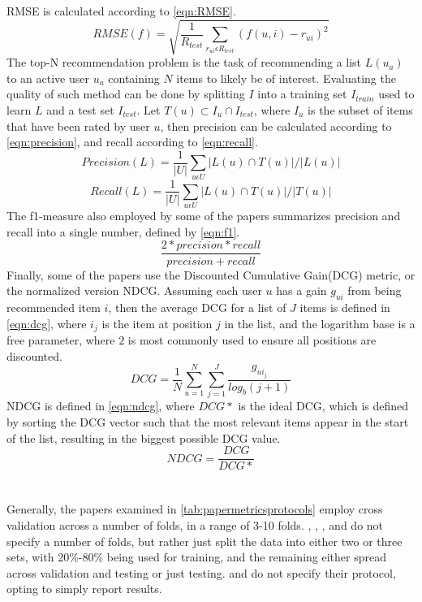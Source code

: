 RMSE is calculated according to \autoref{eqn:RMSE}.
\begin{equation}
    \label{eqn:RMSE}
    RMSE(f) = \sqrt{\frac{1}{R_{test}} \sum\limits_{r_{ui} \epsilon R_{test}} (f(u, i) - r_{ui})^2}
\end{equation}
The top-N recommendation problem is the task of recommending a list $L(u_a)$ to an active user $u_a$ containing $N$ items to likely be of interest.
Evaluating the quality of such method can be done by splitting $I$ into a training set $I_{train}$ used to learn $L$ and a test set $I_{test}$.
Let $T(u) \subset I_u \cap I_{test}$, where $I_u$ is the subset of items that have been rated by user $u$, then precision can be calculated according to \autoref{eqn:precision}, and recall according to \autoref{eqn:recall}.
\begin{equation}
    \label{eqn:precision}
    Precision(L) = \frac{1}{|U|} \sum\limits_{u \epsilon U} |L(u) \cap T(u)| / |L(u)|
\end{equation}
\begin{equation}
    \label{eqn:recall}
    Recall(L) = \frac{1}{|U|} \sum\limits_{u \epsilon U} |L(u) \cap T(u)| / |T(u)|
\end{equation}
The f1-measure also employed by some of the papers summarizes precision and recall into a single number, defined by \autoref{eqn:f1}.
\begin{equation}
    \label{eqn:f1}
    \frac{2*precision*recall}{precision+recall}
\end{equation}
Finally, some of the papers use the Discounted Cumulative Gain(DCG) metric, or the normalized version NDCG.
Assuming each user $u$ has a gain $g_{ui}$ from being recommended item $i$, then the average DCG for a list of $J$ items is defined in \autoref{eqn:dcg}, where $i_j$ is the item at position $j$ in the list, and the logarithm base is a free parameter, where $2$ is most commonly used to ensure all positions are discounted.
\begin{equation}
    \label{eqn:dcg}
    DCG = \frac{1}{N} \sum\limits_{u=1}^N \sum\limits_{j = 1}^J \frac{g_{ui_j}}{log_b (j+1)}
\end{equation}
NDCG is defined in \autoref{eqn:ndcg}, where $DCG*$ is the ideal DCG, which is defined by sorting the DCG vector such that the most relevant items appear in the start of the list\cite{dcgpaper}, resulting in the biggest possible DCG value.
\begin{equation}
    \label{eqn:ndcg}
    NDCG = \frac{DCG}{DCG*}
\end{equation}
\\\\
Generally, the papers examined in \autoref{tab:papermetricsprotocols} employ cross validation across a number of folds, in a range of 3-10 folds.
\cite{GameTheoretic}, \cite{Soft-RoughArticle}, \cite{SinghUserItem}, \cite{StackedRecurrentNeuralPaper} and \cite{ContextualInfluencePaper} do not specify a number of folds, but rather just split the data into either two or three sets, with 20\%-80\% being used for training, and the remaining either spread across validation and testing or just testing.
\cite{AuxiliaryInformationPaper} and \cite{ArtificalBeePaper} do not specify their protocol, opting to simply report results.

